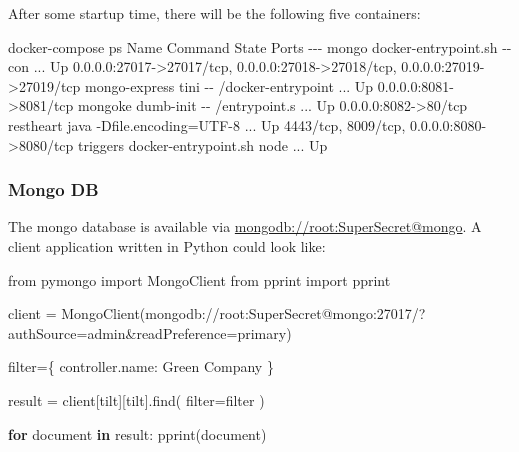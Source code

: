 \documentclass[
]{article}
\newenvironment{Shaded}{}{}
\newcommand{\BuiltInTok}[1]{#1}
\newcommand{\ControlFlowTok}[1]{\textcolor[rgb]{0.00,0.44,0.13}{\textbf{#1}}}
\newcommand{\ExtensionTok}[1]{#1}
\newcommand{\ImportTok}[1]{#1}
\newcommand{\KeywordTok}[1]{\textcolor[rgb]{0.00,0.44,0.13}{\textbf{#1}}}
\newcommand{\NormalTok}[1]{#1}
\newcommand{\OperatorTok}[1]{\textcolor[rgb]{0.40,0.40,0.40}{#1}}
\newcommand{\StringTok}[1]{\textcolor[rgb]{0.25,0.44,0.63}{#1}}
\begin{document}
After some startup time, there will be the following five containers:

\begin{Shaded}
\begin{Highlighting}[]
\ExtensionTok{docker{-}compose}\NormalTok{ ps}
    \ExtensionTok{Name}\NormalTok{                   Command               State                                      Ports}
    \ExtensionTok{{-}{-}{-}}
\ExtensionTok{mongo}\NormalTok{           docker{-}entrypoint.sh {-}{-}con ...   Up      0.0.0.0:27017{-}}\OperatorTok{\textgreater{}}\NormalTok{27017/tcp, 0.0.0.0:27018{-}}\OperatorTok{\textgreater{}}\NormalTok{27018/tcp, 0.0.0.0:27019{-}}\OperatorTok{\textgreater{}}\NormalTok{27019/tcp}
\ExtensionTok{mongo{-}express}\NormalTok{   tini {-}{-} /docker{-}entrypoint ...   Up      0.0.0.0:8081{-}}\OperatorTok{\textgreater{}}\NormalTok{8081/tcp}
\ExtensionTok{mongoke}\NormalTok{         dumb{-}init {-}{-} /entrypoint.s ...   Up      0.0.0.0:8082{-}}\OperatorTok{\textgreater{}}\NormalTok{80/tcp}
\ExtensionTok{restheart}\NormalTok{       java {-}Dfile.encoding=UTF{-}8 ...   Up      4443/tcp, 8009/tcp, 0.0.0.0:8080{-}}\OperatorTok{\textgreater{}}\NormalTok{8080/tcp}
\ExtensionTok{triggers}\NormalTok{        docker{-}entrypoint.sh node  ...   Up}
\end{Highlighting}
\end{Shaded}

\hypertarget{mongo-db}{%
\subsubsection{Mongo DB}\label{mongo-db}}

The mongo database is available via
\href{}{mongodb://root:SuperSecret@mongo}. A client application written
in Python could look like:

\begin{Shaded}
\begin{Highlighting}[]
\ImportTok{from}\NormalTok{ pymongo }\ImportTok{import}\NormalTok{ MongoClient}
\ImportTok{from}\NormalTok{ pprint }\ImportTok{import}\NormalTok{ pprint}

\NormalTok{client }\OperatorTok{=}\NormalTok{ MongoClient(}\StringTok{\textquotesingle{}mongodb://root:SuperSecret@mongo:27017/?authSource=admin\&readPreference=primary\textquotesingle{}}\NormalTok{)}


\BuiltInTok{filter}\OperatorTok{=}\NormalTok{\{}
    \StringTok{\textquotesingle{}controller.name\textquotesingle{}}\NormalTok{: }\StringTok{\textquotesingle{}Green Company\textquotesingle{}}
\NormalTok{\}}

\NormalTok{result }\OperatorTok{=}\NormalTok{ client[}\StringTok{\textquotesingle{}tilt\textquotesingle{}}\NormalTok{][}\StringTok{\textquotesingle{}tilt\textquotesingle{}}\NormalTok{].find(}
  \BuiltInTok{filter}\OperatorTok{=}\BuiltInTok{filter}
\NormalTok{)}

\ControlFlowTok{for}\NormalTok{ document }\KeywordTok{in}\NormalTok{ result:}
\NormalTok{    pprint(document)}
\end{Highlighting}
\end{Shaded}
\end{document}
